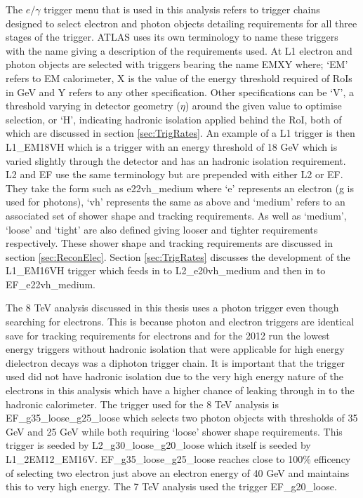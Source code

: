 		The $e/\gamma$ trigger menu that is used in this analysis refers to trigger chains designed to select electron and photon objects detailing requirements for all three stages of the trigger. ATLAS uses its own terminology to name these triggers with the name giving a description of the requirements used. At L1 electron and photon objects are selected with triggers bearing the name EMXY where; `EM' refers to EM calorimeter, X is the value of the energy threshold required of RoIs in GeV and Y refers to any other specification. Other specifications can be `V', a threshold varying in detector geometry ($\eta$) around the given value to optimise selection, or `H', indicating hadronic isolation applied behind the RoI, both of which are discussed in section \ref{sec:TrigRates}. An example of a L1 trigger is then L1\_EM18VH which is a trigger with an energy threshold of 18 GeV which is varied slightly through the detector and has an hadronic isolation requirement. L2 and EF use the same terminology but are prepended with either L2 or EF. They take the form such as e22vh\_medium where `e' represents an electron (g is used for photons), `vh' represents the same as above and `medium' refers to an associated set of shower shape and tracking requirements. As well as `medium', `loose' and `tight' are also defined giving looser and tighter requirements respectively. These shower shape and tracking requirements are discussed in section \ref{sec:ReconElec}. Section \ref{sec:TrigRates} discusses the development of the L1\_EM16VH trigger which feeds in to L2\_e20vh\_medium and then in to EF\_e22vh\_medium. 

		The 8 TeV analysis discussed in this thesis uses a photon trigger even though searching for electrons. This is because photon and electron triggers are identical save for tracking requirements for electrons and for the 2012 run the lowest energy triggers without hadronic isolation that were applicable for high energy dielectron decays was a diphoton trigger chain. It is important that the trigger used did not have hadronic isolation due to the very high energy nature of the electrons in this analysis which have a higher chance of leaking through in to the hadronic calorimeter. The trigger used for the 8 TeV analysis is EF\_g35\_loose\_g25\_loose which selects two photon objects with thresholds of 35 GeV and 25 GeV while both requiring `loose' shower shape requirements. This trigger is seeded by L2\_g30\_loose\_g20\_loose which itself is seeded by L1\_2EM12\_EM16V. EF\_g35\_loose\_g25\_loose reaches close to 100\% efficency of selecting two electron just above an electron energy of 40 GeV and maintains this to very high energy. The 7 TeV analysis used the trigger EF\_g20\_loose.

